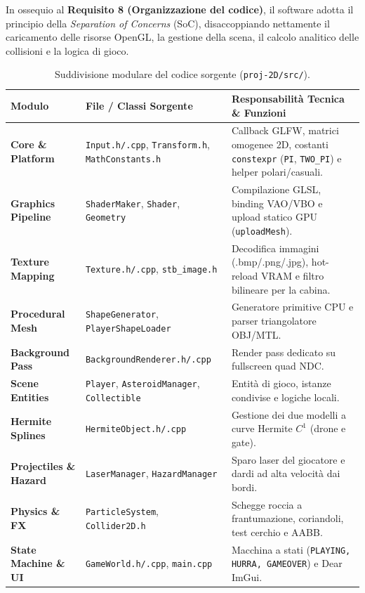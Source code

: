 \documentclass[11pt,a4paper]{article}
\begin{document}
In ossequio al \textbf{Requisito 8 (Organizzazione del codice)}, il software adotta il principio della \textit{Separation of Concerns} (SoC), disaccoppiando nettamente il caricamento delle risorse OpenGL, la gestione della scena, il calcolo analitico delle collisioni e la logica di gioco.

\begin{table}[H]
\centering
\small
\begin{tabularx}{\linewidth}{@{}p{3.1cm} p{4.6cm} X@{}}
\toprule
\textbf{Modulo} & \textbf{File / Classi Sorgente} & \textbf{Responsabilità Tecnica \& Funzioni} \\
\midrule
\textbf{Core \& Platform} & \texttt{Input.h/.cpp}, \texttt{Transform.h}, \texttt{MathConstants.h} & Callback GLFW, matrici omogenee 2D, costanti \texttt{constexpr} (\texttt{PI}, \texttt{TWO\_PI}) e helper polari/casuali. \\
\textbf{Graphics Pipeline} & \texttt{ShaderMaker}, \texttt{Shader}, \texttt{Geometry} & Compilazione GLSL, binding VAO/VBO e upload statico GPU (\texttt{uploadMesh}). \\
\textbf{Texture Mapping} & \texttt{Texture.h/.cpp}, \texttt{stb\_image.h} & Decodifica immagini (.bmp/.png/.jpg), hot-reload VRAM e filtro bilineare per la cabina. \\
\textbf{Procedural Mesh} & \texttt{ShapeGenerator}, \texttt{PlayerShapeLoader} & Generatore primitive CPU e parser triangolatore OBJ/MTL. \\
\textbf{Background Pass} & \texttt{BackgroundRenderer.h/.cpp} & Render pass dedicato su fullscreen quad NDC. \\
\textbf{Scene Entities} & \texttt{Player}, \texttt{AsteroidManager}, \texttt{Collectible} & Entità di gioco, istanze condivise e logiche locali. \\
\textbf{Hermite Splines} & \texttt{HermiteObject.h/.cpp} & Gestione dei due modelli a curve Hermite $C^1$ (drone e gate). \\
\textbf{Projectiles \& Hazard} & \texttt{LaserManager}, \texttt{HazardManager} & Sparo laser del giocatore e dardi ad alta velocità dai bordi. \\
\textbf{Physics \& FX} & \texttt{ParticleSystem}, \texttt{Collider2D.h} & Schegge roccia a frantumazione, coriandoli, test cerchio e AABB. \\
\textbf{State Machine \& UI} & \texttt{GameWorld.h/.cpp}, \texttt{main.cpp} & Macchina a stati (\texttt{PLAYING, HURRA, GAMEOVER}) e Dear ImGui. \\
\bottomrule
\end{tabularx}
\caption{Suddivisione modulare del codice sorgente (\texttt{proj-2D/src/}).}
\label{tab:architecture}
\end{table}
\end{document}
